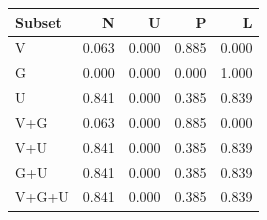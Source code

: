 \begin{tabular}{@{}lrrrr@{}}
\toprule
Subset & N & U & P & L \\
\midrule
V & 0.063 & 0.000 & 0.885 & 0.000 \\
G & 0.000 & 0.000 & 0.000 & 1.000 \\
U & 0.841 & 0.000 & 0.385 & 0.839 \\
V+G & 0.063 & 0.000 & 0.885 & 0.000 \\
V+U & 0.841 & 0.000 & 0.385 & 0.839 \\
G+U & 0.841 & 0.000 & 0.385 & 0.839 \\
V+G+U & 0.841 & 0.000 & 0.385 & 0.839 \\
\bottomrule
\end{tabular}
